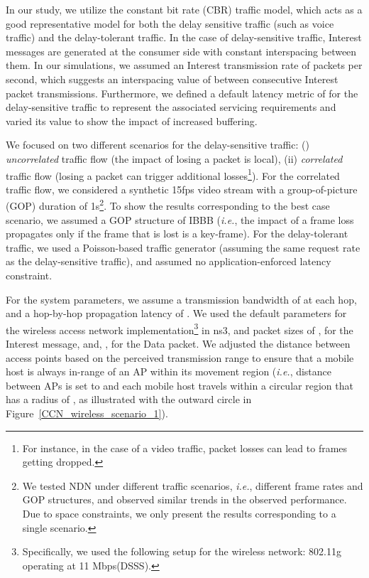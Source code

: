 \documentclass[conference]{IEEEtran}
\begin{document}
In our study, we utilize the constant bit rate (CBR) traffic model, which acts as a good representative model for both the delay sensitive traffic (such as voice traffic) and the delay-tolerant traffic. In the case of delay-sensitive traffic, Interest messages are generated at the consumer side with constant interspacing between them. In our simulations, we assumed an Interest transmission rate of  packets per second, which suggests an interspacing value of  between consecutive Interest packet transmissions. Furthermore, we defined a default latency metric of  for the delay-sensitive traffic to represent the associated servicing requirements and varied its value to show the impact of increased buffering.

We focused on two different scenarios for the delay-sensitive traffic: () \emph{uncorrelated} traffic flow (the impact of losing a packet is local), (ii) \emph{correlated} traffic flow (losing a packet can trigger additional losses\footnote{For instance, in the case of a video traffic, packet losses can lead to frames getting dropped.}). For the correlated traffic flow, we considered a synthetic 15fps video stream with a group-of-picture (GOP) duration of 1s\footnote{We tested NDN under different traffic scenarios, \emph{i.e.}, different frame rates and GOP structures, and observed similar trends in the observed performance. Due to space constraints, we only present the results corresponding to a single scenario.}. To show the results corresponding to the best case scenario, we assumed a GOP structure of IBBB (\emph{i.e.}, the impact of a frame loss propagates only if the frame that is lost is a key-frame). For the delay-tolerant traffic, we used a Poisson-based traffic generator (assuming the same request rate as the delay-sensitive traffic), and assumed no application-enforced latency constraint.

For the system parameters, we assume a transmission bandwidth of  at each hop, and a hop-by-hop propagation latency of . We used the default parameters for the wireless access network implementation\footnote{Specifically, we used the following setup for the wireless network: 802.11g operating at 11 Mbps(DSSS).} in ns3, and packet sizes of , for the Interest message, and, , for the Data packet. We adjusted the distance between access points based on the perceived transmission range to ensure that a mobile host is always in-range of an AP within its movement region (\emph{i.e.}, distance between APs is set to  and each mobile host travels within a circular region that has a radius of , as illustrated with the outward circle in Figure~\ref{CCN_wireless_scenario_1}).
\end{document}

